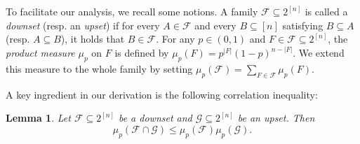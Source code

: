 \documentclass[11pt]{article}
\newtheorem{lemma}[theorem]{Lemma}
\begin{document}
To facilitate our analysis, we recall some  notions. A family $\mathcal{F} \subseteq 2^{[n]}$ is called a \textit{downset} (resp. an \textit{upset}) if for every $A \in \mathcal{F}$ and every $B \subseteq [n]$ satisfying $B \subseteq A$ (resp. $A \subseteq B$), it holds that $B \in \mathcal{F}$.
For any $p\in (0,1)$ and $F\in \mathcal{F} \subseteq 2^{[n]}$, the \textit{product measure} $\mu_p$ on $F$ is defined by $\mu_p(F)=p^{|F|}(1-p)^{n-|F|}$. We extend this measure to the whole family by setting $\mu_p(\mathcal{F}) = \sum_{F \in \mathcal{F}} \mu_p(F)$.

A key ingredient in our derivation is the following correlation inequality:


\begin{lemma}\cite{S12}\label{S12}
Let  $\mathcal{F} \subseteq 2^{[n]}$ be a downset and $\mathcal{G} \subseteq 2^{[n]}$ be an upset. Then
$$
\mu_p(\mathcal{F}\cap \mathcal{G})\leq\mu_p(\mathcal{F})\mu_p(\mathcal{G}).
$$
\end{lemma}
\end{document}
